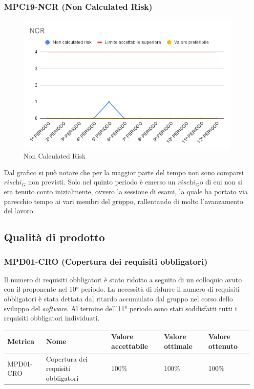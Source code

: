 \subsubsection{MPC19-NCR (Non Calculated Risk)}
\begin{figure}[H]
  \centering
  \includegraphics[width=0.7\linewidth]{grafici/NCR.png}
  \caption{Non Calculated Risk}
\end{figure}
Dal grafico si può notare che per la maggior parte del tempo non sono comparsi $\textit{rischi}_G$ non previsti. Solo nel quinto periodo è emerso un $\textit{rischi}_G$o di cui non si era tenuto conto inizialmente, ovvero la sessione di esami, la quale ha portato via parecchio tempo ai vari membri del gruppo, rallentando di molto l'avanzamento del lavoro.
\subsection{Qualità di prodotto}
\subsubsection{MPD01-CRO (Copertura dei requisiti obbligatori)}
Il numero di requisiti obbligatori è stato ridotto a seguito di un colloquio avuto con il proponente nel 10° periodo. La necessità di ridurre il numero di requisiti obbligatori è stata dettata dal ritardo accumulato dal gruppo nel corso dello sviluppo del \textit{software}. Al termine dell'11° periodo sono stati soddisfatti tutti i requisiti obbligatori individuati. 
\begin{center}
    \begin{tabular}{|p{3cm}|p{4cm}|p{3cm}|p{3cm}|p{3cm}|}
    \hline
    \textbf{Metrica} & \textbf{Nome} & \textbf{Valore \newline accettabile} & \textbf{Valore \newline ottimale} & \textbf{Valore \newline ottenuto} \\
    \hline
    MPD01-CRO & Copertura dei requisiti obbligatori & 100\% & 100\% & 100\% \\
    \hline
    \end{tabular}
\end{center}


